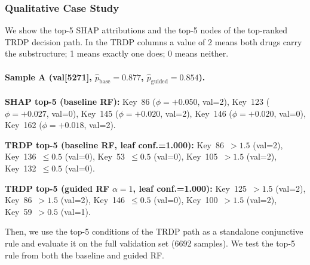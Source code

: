 \documentclass[letterpaper]{article} %
\begin{document}
\begin{table}[h]
\centering
\caption{Comparative analysis for Sample~A (val[5271]). Prediction consistency ($\bar{C}$) and path-feature Jaccard ($\bar{S}_J$) for baseline vs.\ SHAP-guided RF. For $k\leq10$ no neighbours exist.}
\label{tab:comparative_a}
\end{table}

\subsubsection{Qualitative Case Study}

We show the top-5 SHAP attributions and the top-5 nodes of the top-ranked TRDP decision path.  In the TRDP columns a value of 2 means both drugs carry the substructure; 1 means exactly one does; 0 means neither.

\paragraph{Sample A (val[5271], $\hat{p}_{\text{base}}=0.877$, $\hat{p}_{\text{guided}}=0.854$).}

\noindent\textbf{SHAP top-5 (baseline RF):} Key~86 ($\phi{=}{+}0.050$, val=2), Key~123 ($\phi{=}{+}0.027$, val=0), Key~145 ($\phi{=}{+}0.020$, val=2), Key~146 ($\phi{=}{+}0.020$, val=0), Key~162 ($\phi{=}{+}0.018$, val=2).

\noindent\textbf{TRDP top-5 (baseline RF, leaf conf.=1.000):} Key~86~$>1.5$ (val=2), Key~136~$\leq0.5$ (val=0), Key~53~$\leq0.5$ (val=0), Key~105~$>1.5$ (val=2), Key~132~$\leq0.5$ (val=0).

\noindent\textbf{TRDP top-5 (guided RF $\alpha{=}1$, leaf conf.=1.000):} Key~125~$>1.5$ (val=2), Key~86~$>1.5$ (val=2), Key~146~$\leq0.5$ (val=0), Key~100~$>1.5$ (val=2), Key~59~$>0.5$ (val=1).

Then, we use the top-5 conditions of the TRDP path as a standalone conjunctive rule and evaluate it on the full validation set (6692 samples). We test the top-5 rule from both the baseline and guided RF.
\end{document}
